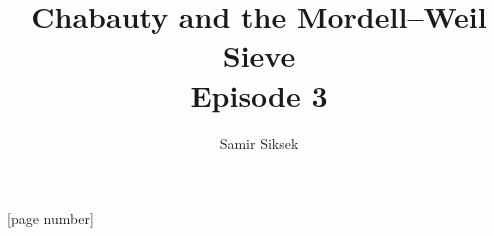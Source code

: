 \documentclass{beamer}
\newcommand{\Q}{{\mathbb Q}}
\theoremstyle{definition}
\theoremstyle{remark}
\begin{document}
\title{Chabauty and the Mordell--Weil Sieve\\
Episode 3} 
\author{Samir Siksek}
\date{}

[page number]{}


\frame{\titlepage}

\begin{comment}
\begin{frame}
Recall: given a curve $C$ over $\Q$, or over a number
field $k$, we want a complete description of $C(k)$.
For genus $\ge 1$, there is no known algorithm for giving this!
But there is a bag of tricks that can be used to show
that $C(k)$ is empty, or determine $C(k)$ if it is non-empty.
These include:
\begin{enumerate}
\item Quotients (lecture 1);
\item Descent (lecture 2);
\item Chabauty (lecture 3);
\item Mordell--Weil sieve (\textcolor{red}{today}).
\end{enumerate}

The purpose of these lectures is to get a feel for each of these
methods and see it applied to a particular example.
\end{frame}
\end{comment}
\end{document}
